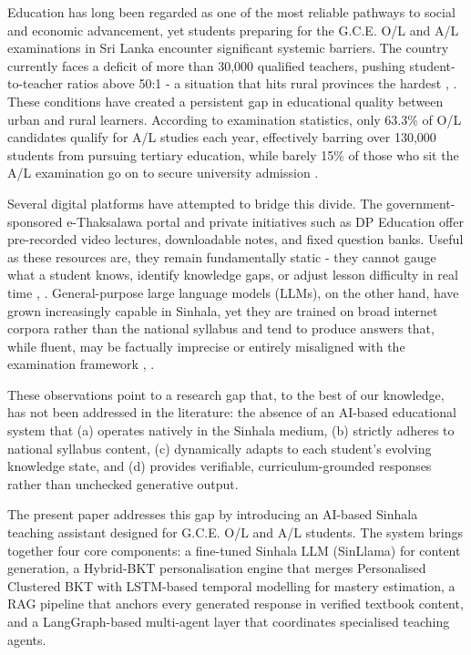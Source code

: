 \documentclass[conference]{IEEEtran}
\begin{document}
Education has long been regarded as one of the most reliable pathways to social and economic advancement, yet students preparing for the G.C.E. O/L and A/L examinations in Sri Lanka encounter significant systemic barriers. The country currently faces a deficit of more than 30,000 qualified teachers, pushing student-to-teacher ratios above 50:1 - a situation that hits rural provinces the hardest \cite{b1}, \cite{b2}. These conditions have created a persistent gap in educational quality between urban and rural learners. According to examination statistics, only 63.3\% of O/L candidates qualify for A/L studies each year, effectively barring over 130,000 students from pursuing tertiary education, while barely 15\% of those who sit the A/L examination go on to secure university admission \cite{b3}.

Several digital platforms have attempted to bridge this divide. The government-sponsored e-Thaksalawa portal \cite{b4} and private initiatives such as DP Education offer pre-recorded video lectures, downloadable notes, and fixed question banks. Useful as these resources are, they remain fundamentally static - they cannot gauge what a student knows, identify knowledge gaps, or adjust lesson difficulty in real time \cite{b5}, \cite{b6}. General-purpose large language models (LLMs), on the other hand, have grown increasingly capable in Sinhala, yet they are trained on broad internet corpora rather than the national syllabus and tend to produce answers that, while fluent, may be factually imprecise or entirely misaligned with the examination framework \cite{b7}, \cite{b8}.

These observations point to a research gap that, to the best of our knowledge, has not been addressed in the literature: the absence of an AI-based educational system that (a) operates natively in the Sinhala medium, (b) strictly adheres to national syllabus content, (c) dynamically adapts to each student's evolving knowledge state, and (d) provides verifiable, curriculum-grounded responses rather than unchecked generative output.

The present paper addresses this gap by introducing an AI-based Sinhala teaching assistant designed for G.C.E. O/L and A/L students. The system brings together four core components: a fine-tuned Sinhala LLM (SinLlama) for content generation, a Hybrid-BKT personalisation engine that merges Personalised Clustered BKT with LSTM-based temporal modelling for mastery estimation, a RAG pipeline that anchors every generated response in verified textbook content, and a LangGraph-based multi-agent layer that coordinates specialised teaching agents.
\end{document}
